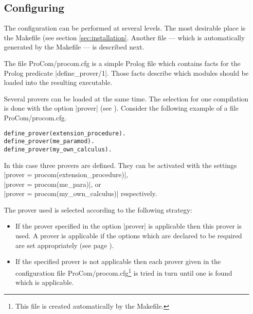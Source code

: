 \subsection{Configuring \ProCom}\label{procom.config}

The configuration can be performed at several levels. The most desirable place
is the Makefile (see section \ref{sec:installation}. Another file --- which is
automatically generated by the Makefile --- is described next.

The file {\sf ProCom/procom.cfg}\/ is a simple Prolog file which contains
facts for the Prolog predicate |define_prover/1|. Those facts describe which
modules should be loaded into the resulting \ProCom{} executable.

Several provers can be loaded at the same time. The selection for one
compilation is done with the option |prover| (see \pageref{opt:prover}).
Consider the following example of a file {\sf ProCom/procom.cfg}.

\begin{Sample}
\begin{verbatim}
define_prover(extension_procedure).
define_prover(me_paramod).
define_prover(my_own_calculus).
\end{verbatim}
\end{Sample}

In this case three provers are defined. They can be activated with the
settings
\\ |prover = procom(extension_procedure)|,
\\ |prover = procom(me_para)|, or
\\ |prover = procom(my_own_calculus)| respectively.


The prover used is selected according to the following strategy:
\begin{itemize}
\item If the prover specified in the option |prover| is applicable then this
  prover is used. A prover is applicable if the options which are declared to
  be required are set appropriately (see page \pageref{require_option}).

\item If the specified prover is not applicable then each prover given in the
  configuration file {\sf ProCom/procom.cfg}\footnote{This file is
    created automatically by the Makefile.} is tried in turn until one is
  found which is applicable.
\end{itemize}



